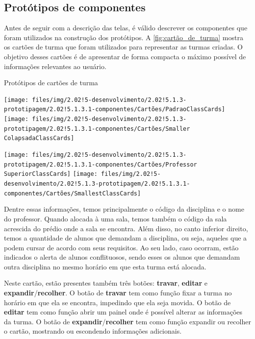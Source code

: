 \subsection{Protótipos de componentes} %

Antes de seguir com a descrição das telas, é válido descrever os componentes que foram utilizados na construção dos protótipos. A \autoref{fig:cartão_de_turma} mostra os cartões de turma que foram utilizados para representar as turmas criadas. O objetivo desses cartões é de apresentar de forma compacta o máximo possível de informações relevantes ao usuário.

\begin{MyCenteredFigure}
  \caption{Protótipos de cartões de turma}
  \label{fig:cartão_de_turma}
  \begin{minipage}{0.48\textwidth} \centering
    \texttt{[image: files/img/2.02!5-desenvolvimento/2.02!5.1.3-prototipagem/2.02!5.1.3.1-componentes/Cartões/PadraoClassCards]}
    \vspace{1mm} \vfill
    \texttt{[image: files/img/2.02!5-desenvolvimento/2.02!5.1.3-prototipagem/2.02!5.1.3.1-componentes/Cartões/Smaller ColapsadaClassCards]}
  \end{minipage}
  \hfill
  \begin{minipage}{0.48\textwidth} \centering
    \texttt{[image: files/img/2.02!5-desenvolvimento/2.02!5.1.3-prototipagem/2.02!5.1.3.1-componentes/Cartões/Professor SuperiorClassCards]}
    \vspace{1mm} \vfill
    \texttt{[image: files/img/2.02!5-desenvolvimento/2.02!5.1.3-prototipagem/2.02!5.1.3.1-componentes/Cartões/SmallestClassCards]}
  \end{minipage}
\end{MyCenteredFigure}

Dentre essas informações, temos principalmente o código da disciplina e o nome do professor. Quando alocada à uma sala, temos também o código da sala acrescida do prédio onde a sala se encontra. Além disso, no canto inferior direito, temos a quantidade de alunos que demandam a disciplina, ou seja, aqueles que a podem cursar de acordo com seus requisitos. Ao seu lado, caso ocorram, estão indicados o alerta de alunos conflituosos, sendo esses os alunos que demandam outra disciplina no mesmo horário em que esta turma está alocada.

Neste cartão, estão presentes também três botões: \textbf{travar}, \textbf{editar} e \textbf{expandir}/\textbf{recolher}. O botão de \textbf{travar} tem como função fixar a turma no horário em que ela se encontra, impedindo que ela seja movida. O botão de \textbf{editar} tem como função abrir um painel onde é possível alterar as informações da turma. O botão de \textbf{expandir}/\textbf{recolher} tem como função expandir ou recolher o cartão, mostrando ou escondendo informações adicionais.


